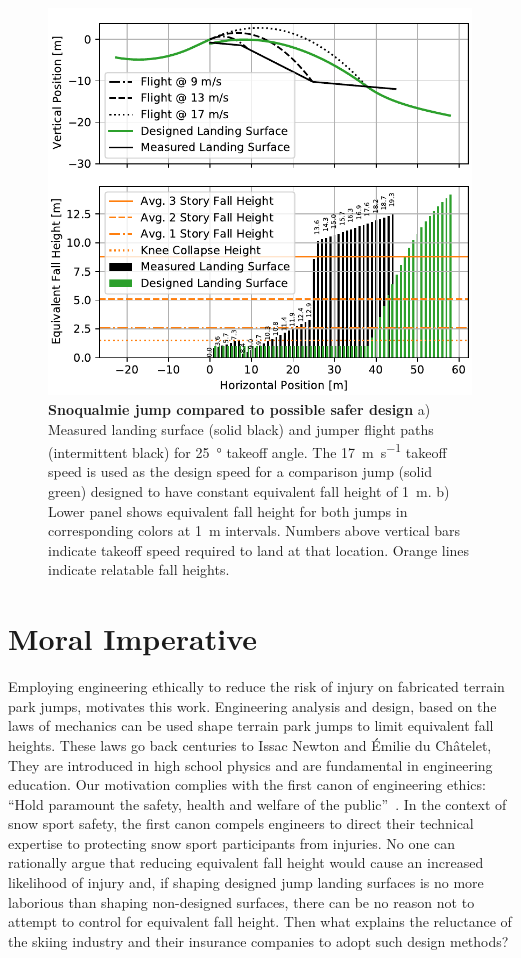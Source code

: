 \documentclass{article}
\begin{document}
\begin{figure}
  \centering
  \includegraphics[width=5.25in]{figures/salvini-v-snoqualmie.pdf}
  \caption{\textbf{Snoqualmie jump compared to possible safer design}
  a) Measured landing surface (solid black) and jumper flight paths (intermittent
  black) for 25~\si{\degree} takeoff angle. The
  17~\si{\meter\per\second} takeoff speed is used as the design speed for a comparison
  jump (solid green) designed to have constant equivalent fall height of 1~\si{\meter}.
  b) Lower panel shows equivalent fall height for both jumps
  in corresponding colors at 1~\si{\meter} intervals. Numbers above
  vertical bars indicate takeoff speed required
  to land at that location. Orange lines indicate relatable fall heights.}
  \label{fig:salvini-v-snoqualmie}
\end{figure}

\section{Moral Imperative}
%
Employing engineering ethically to reduce the risk of injury on fabricated terrain park jumps, motivates this work. Engineering analysis and design, based on the laws of mechanics can be used shape terrain park jumps to limit equivalent fall heights. These laws go back centuries to Issac Newton and Émilie du Châtelet, They are introduced in high school physics and are fundamental in engineering education. Our motivation complies with the first canon of engineering ethics: ``Hold paramount the safety, health and
welfare of the public''~\cite{NSPE2019}. In the context of snow sport safety,
the first canon compels engineers to direct their technical expertise to
protecting snow sport participants from injuries. No one can rationally argue
that reducing equivalent fall height would cause an increased likelihood of injury
and, if shaping designed jump landing surfaces is no more laborious than shaping
non-designed surfaces, there can be no reason not to attempt to control for
equivalent fall height. Then what explains the reluctance of the skiing industry and their insurance companies 
to adopt such design methods?
\end{document}
